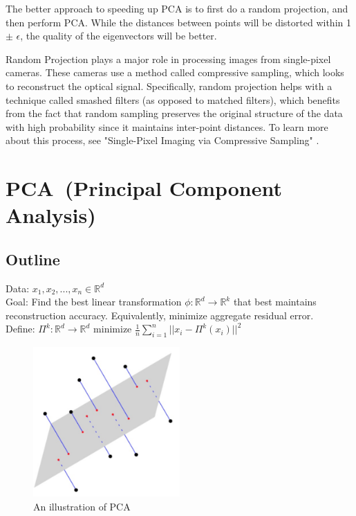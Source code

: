 The better approach to speeding up PCA is to first do a random
projection, and then perform PCA. While the distances between points
will be distorted within 1 $\pm$ $\epsilon$, the quality of the
eigenvectors will be better.

Random Projection plays a major role in processing images from
single-pixel cameras. These cameras use a method called compressive
sampling, which looks to reconstruct the optical signal. 
Specifically, random projection helps with a technique called 
smashed filters (as opposed to matched filters), which benefits from
the fact that random sampling preserves the original structure of the
data with high probability since it maintains inter-point distances. 
To learn more about this process, see "Single-Pixel Imaging via 
Compressive Sampling" \cite{duarte}.

\section{PCA~(Principal Component Analysis)}
\subsection{Outline}
Data: $x_1,x_2,...,x_n \in \mathbb{R}^d$\\

\noindent Goal: Find the best linear transformation $\phi:
\mathbb{R}^d \rightarrow \mathbb{R}^k$ that best maintains
reconstruction accuracy. Equivalently, minimize aggregate residual
error.\\ 

\noindent Define: $\Pi^k: \mathbb{R}^d \rightarrow \mathbb{R}^d$
minimize $\frac{1}{n} \sum_{i=1}^n ||x_i - \Pi^k (x_i)||^2$\\

\begin{figure}[h!]
\begin{center}
\includegraphics[width=0.5\textwidth]{chapter_6/files/projections.jpg}
\caption{An illustration of PCA}
\end{center}
\end{figure}
